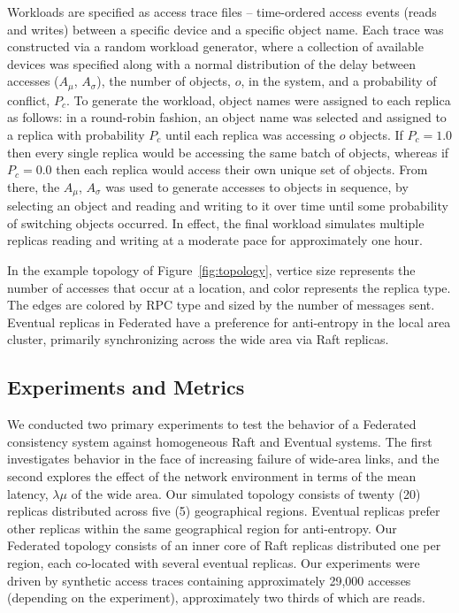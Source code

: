 \documentclass[10pt,conference,letterpaper]{IEEEtran}
\begin{document}
Workloads are specified as access trace files -- time-ordered access events (reads and
writes) between a specific device and a specific object name.
Each trace was constructed via a random workload generator, where a collection of
available devices was specified along with a normal distribution of the delay between
accesses ($A_{\mu}$, $A_{\sigma}$), the number of objects, $o$, in the system, and a
probability of conflict, $P_c$.
To generate the workload, object names were assigned to each replica as follows: in a
round-robin fashion, an object name was selected and assigned to a replica with
probability $P_c$ until each replica was accessing $o$ objects.
If $P_c = 1.0$ then every single replica would be accessing the same batch of objects,
whereas if $P_c = 0.0$ then each replica would access their own unique set of objects.
From there, the $A_{\mu}$, $A_{\sigma}$ was used to generate accesses to objects in
sequence, by selecting an object and reading and writing to it over time until some
probability of switching objects occurred.
In effect, the final workload simulates multiple replicas reading and writing at a
moderate pace for approximately one hour.

In the example topology of Figure~\ref{fig:topology}, 
vertice size represents the number of
accesses that occur at a location, and color represents the
replica type.
The edges are colored by RPC type and sized by the
number of messages sent.
Eventual replicas in Federated have a preference for anti-entropy in the local
area cluster, primarily synchronizing across the wide area via Raft replicas.

\subsection{Experiments and Metrics}

We conducted two primary experiments to test the behavior of a Federated consistency
system against homogeneous Raft and Eventual systems.
The first investigates behavior in the face of increasing failure of wide-area
links, and the
second explores the effect of the network environment in terms of the mean latency,
$\lambda{\mu}$ of the wide area.
Our simulated topology consists of twenty (20) replicas distributed across five (5)
geographical regions.
Eventual replicas prefer other replicas within the same geographical region for
anti-entropy.
Our Federated topology consists of an inner core of Raft replicas distributed one per region,
each co-located with several eventual replicas.
Our experiments were driven by synthetic access traces containing approximately 29,000
accesses (depending on the experiment), approximately two thirds of which are reads.
\end{document}
